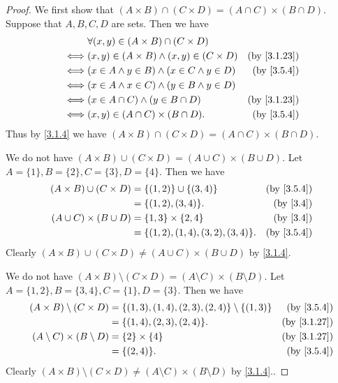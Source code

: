 \begin{proof}
  We first show that \((A \times B) \cap (C \times D) = (A \cap C) \times (B \cap D)\).
  Suppose that \(A, B, C, D\) are sets.
  Then we have
  \begin{align*}
         & \forall (x, y) \in (A \times B) \cap (C \times D)                                 \\
    \iff & (x, y) \in (A \times B) \land (x, y) \in (C \times D) & \text{(by \cref{3.1.23})} \\
    \iff & (x \in A \land y \in B) \land (x \in C \land y \in D) & \text{(by \cref{3.5.4})}  \\
    \iff & (x \in A \land x \in C) \land (y \in B \land y \in D)                             \\
    \iff & (x \in A \cap C) \land (y \in B \cap D)               & \text{(by \cref{3.1.23})} \\
    \iff & (x, y) \in (A \cap C) \times (B \cap D).              & \text{(by \cref{3.5.4})}
  \end{align*}
  Thus by \cref{3.1.4} we have \((A \times B) \cap (C \times D) = (A \cap C) \times (B \cap D)\).

  We do not have \((A \times B) \cup (C \times D) = (A \cup C) \times (B \cup D)\).
  Let \(A = \{1\}, B = \{2\}, C = \{3\}, D = \{4\}\).
  Then we have
  \begin{align*}
    (A \times B) \cup (C \times D) & = \{(1, 2)\} \cup \{(3, 4)\}          & \text{(by \cref{3.5.4})} \\
                                   & = \{(1, 2), (3, 4)\}.                 & \text{(by \cref{3.4})}   \\
    (A \cup C) \times (B \cup D)   & = \{1, 3\} \times \{2, 4\}            & \text{(by \cref{3.4})}   \\
                                   & = \{(1, 2), (1, 4), (3, 2), (3, 4)\}. & \text{(by \cref{3.5.4})}
  \end{align*}
  Clearly \((A \times B) \cup (C \times D) \neq (A \cup C) \times (B \cup D)\) by \cref{3.1.4}.

  We do not have \((A \times B) \setminus (C \times D) = (A \setminus C) \times (B \setminus D)\).
  Let \(A = \{1, 2\}, B = \{3, 4\}, C = \{1\}, D = \{3\}\).
  Then we have
  \begin{align*}
    (A \times B) \setminus (C \times D)    & = \{(1, 3), (1, 4), (2, 3), (2, 4)\} \setminus \{(1, 3)\} & \text{(by \cref{3.5.4})}  \\
                                           & = \{(1, 4), (2, 3), (2, 4)\}.                             & \text{(by \cref{3.1.27})} \\
    (A \setminus C) \times (B \setminus D) & = \{2\} \times \{4\}                                      & \text{(by \cref{3.1.27})} \\
                                           & = \{(2, 4)\}.                                             & \text{(by \cref{3.5.4})}
  \end{align*}
  Clearly \((A \times B) \setminus (C \times D) \neq (A \setminus C) \times (B \setminus D)\) by \cref{3.1.4}..
\end{proof}

